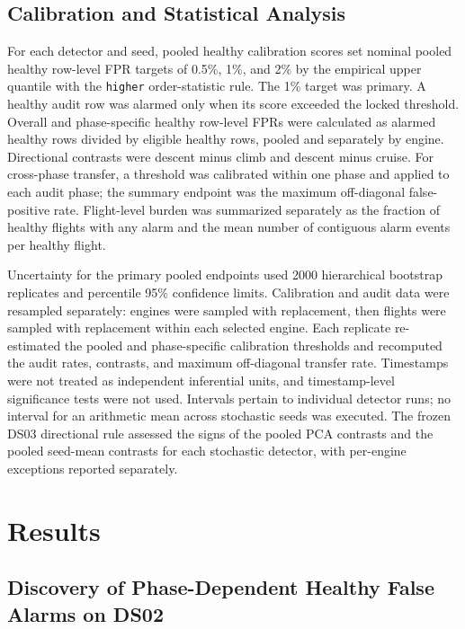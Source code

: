 \documentclass[10pt,twocolumn]{article}
\begin{document}
\subsection{Calibration and Statistical Analysis}\label{calibration-and-statistical-analysis}

For each detector and seed, pooled healthy calibration scores set nominal pooled healthy row-level FPR targets of 0.5\%, 1\%, and 2\% by the empirical upper quantile with the \texttt{higher} order-statistic rule. The 1\% target was primary. A healthy audit row was alarmed only when its score exceeded the locked threshold. Overall and phase-specific healthy row-level FPRs were calculated as alarmed healthy rows divided by eligible healthy rows, pooled and separately by engine. Directional contrasts were descent minus climb and descent minus cruise. For cross-phase transfer, a threshold was calibrated within one phase and applied to each audit phase; the summary endpoint was the maximum off-diagonal false-positive rate. Flight-level burden was summarized separately as the fraction of healthy flights with any alarm and the mean number of contiguous alarm events per healthy flight.

Uncertainty for the primary pooled endpoints used 2000 hierarchical bootstrap replicates and percentile 95\% confidence limits. Calibration and audit data were resampled separately: engines were sampled with replacement, then flights were sampled with replacement within each selected engine. Each replicate re-estimated the pooled and phase-specific calibration thresholds and recomputed the audit rates, contrasts, and maximum off-diagonal transfer rate. Timestamps were not treated as independent inferential units, and timestamp-level significance tests were not used. Intervals pertain to individual detector runs; no interval for an arithmetic mean across stochastic seeds was executed. The frozen DS03 directional rule assessed the signs of the pooled PCA contrasts and the pooled seed-mean contrasts for each stochastic detector, with per-engine exceptions reported separately.

\section{Results}\label{results}

\subsection{Discovery of Phase-Dependent Healthy False Alarms on DS02}\label{discovery-of-phase-dependent-healthy-false-alarms-on-ds02}
\end{document}
